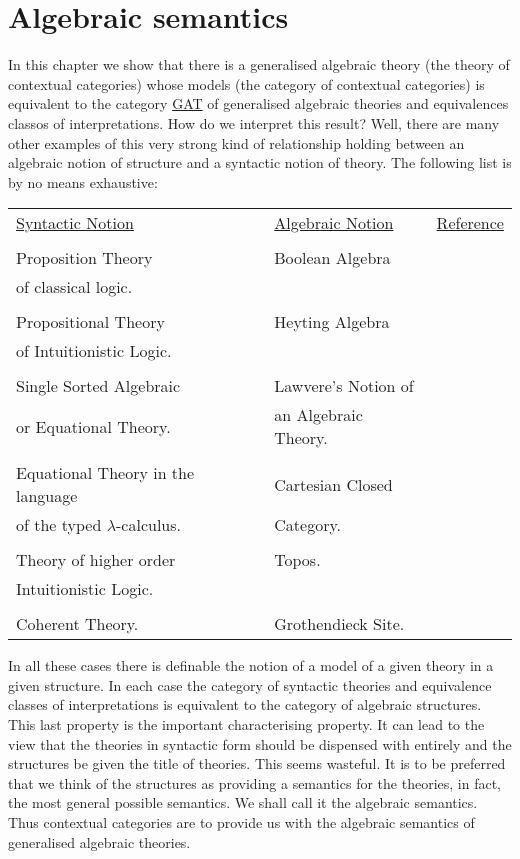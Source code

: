 \newcommand{\id}{\operatorname{id}}
\section{Algebraic semantics} \label{sec:source-2-1}
In this chapter we show that there is a generalised algebraic theory (the theory of contextual categories) whose models (the category of contextual categories) is equivalent to the category \underline{GAT} of generalised algebraic theories and equivalences classos of interpretations.
%
How do we interpret this result?
%
Well, there are many other examples of this very strong kind of relationship holding between an algebraic notion of structure and a syntactic notion of theory.
%
The following list is by no means exhaustive:
\begin{table}
  \centering
 \begin{tabular}{lll}
  \underline{Syntactic Notion} & \underline{Algebraic Notion} & \underline{Reference}\\
   & &\\
  Proposition Theory & Boolean Algebra\\
   of classical logic. \\
   & & \\
  Propositional Theory & Heyting Algebra\\
   of Intuitionistic Logic. \\
   & & \\
  Single Sorted Algebraic & Lawvere's Notion of\\
   or Equational Theory. & an Algebraic Theory. & \cite[II]{Lawvere} \\
   & & \\
  Equational Theory in the language & Cartesian Closed\\
   of the typed \(\lambda\)-calculus. & Category. & \cite[26]{Myeres}\\
   & & \\
  Theory of higher order & Topos.\\
   Intuitionistic Logic. &  &\cite{Fourman} \\
   & & \\
  Coherent Theory. & Grothendieck Site. & \cite[28]{Reyes}
\end{tabular}
\end{table}

%
%

In all these cases there is definable the notion of a model of a given theory in a given structure.
%
In each case the category of syntactic theories and equivalence classes of interpretations is equivalent to the category of algebraic structures.
%
This last property is the important characterising property.
%
It can lead to the view that the theories in syntactic form should be dispensed with entirely and the structures be given the title of theories.
%
This seems wasteful.
%
It is to be preferred that we think of the structures as providing a semantics for the theories, in fact, the most general possible semantics.
%
We shall call it the algebraic semantics.
%
Thus contextual categories are to provide us with the algebraic semantics of generalised algebraic theories.

